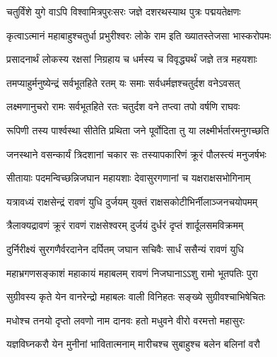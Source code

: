 
\translink{}

\storymeta


\addtocounter{shlokacount}{123}

\twolineshloka
{चतुर्विंशे युगे वाऽपि विश्वामित्रपुरःसरः}
{जज्ञे दशरथस्याथ पुत्रः पद्मयतेक्षणः} %

\twolineshloka
{कृत्वाऽत्मानं महाबाहुश्चतुर्धा प्रभुरीश्वरः}
{लोके राम इति ख्यातस्तेजसा भास्करोपमः} %

\twolineshloka
{प्रसादनार्थं लोकस्य रक्षसां निग्रहाय च}
{धर्मस्य च विवृद्ध्यर्थं जज्ञे तत्र महयशाः} %

\twolineshloka
{तमप्याहुर्मनुष्येन्द्रं सर्वभूतहिते रतम्}
{यः समाः सर्वधर्मज्ञश्चतुर्दश वनेऽवसत्} %

\twolineshloka
{लक्ष्मणानुचरो रामः सर्वभूतहिते रतः}
{चतुर्दश वने तप्त्वा तपो वर्षणि राघवः} %

\twolineshloka
{रूपिणी तस्य पार्श्वस्था सीतेति प्रथिता जने}
{पूर्वोदिता तु या लक्ष्मीर्भर्तारमनुगच्छति} %

\twolineshloka
{जनस्थाने वसन्कार्यं त्रिदशानां चकार सः}
{तस्यापकारिणं क्रूरं पौलस्त्यं मनुजर्षभः} %

\twolineshloka
{सीतायाः पदमन्विच्छन्निजघान महायशाः}
{देवासुरगणानां च यक्षराक्षसभोगिनाम्} %

\twolineshloka
{यत्रावध्यं राक्षसेन्द्रं रावणं युधि दुर्जयम्}
{युक्तं राक्षसकोटीभिर्नीलाञ्जनचयोपमम्} %

\twolineshloka
{त्रैलाक्यद्रावणं क्रूरं रावणं राक्षसेश्वरम्}
{दुर्जयं दुर्धरं दृप्तं शार्दूलसमविक्रमम्} %

\twolineshloka
{दुर्निरीक्ष्यं सुरगणैर्वरदानेन दर्पितम्}
{जघान सचिवैः सार्धं ससैन्यं रावणं युधि} %

\twolineshloka
{महाभ्रगणसङ्काशं महाकायं महाबलम्}
{रावणं निजघानाऽऽशु रामो भूतपतिः पुरा} %

\twolineshloka
{सुग्रीवस्य कृते येन वानरेन्द्रो महाबलः}
{वाली विनिहतः सङ्ख्ये सुग्रीवश्चाभिषेचितः} %

\twolineshloka
{मधोश्च तनयो दृप्तो लवणो नाम दानवः}
{हतो मधुवने वीरो वरमत्तो महासुरः} %

\twolineshloka
{यज्ञविघ्नकरौ येन मुनीनां भावितात्मनाम्}
{मारीचश्च सुबाहुश्च बलेन बलिनां वरौ} %

